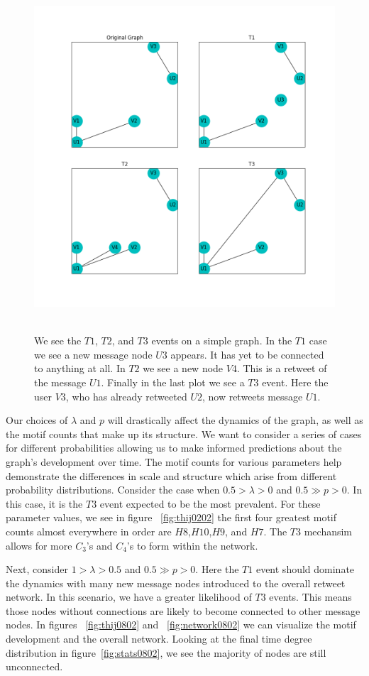 \begin{figure}
    \includegraphics[width=12cm]{Images/events.png}\
    \centering
    \caption{We see the $T1$, $T2$, and $T3$ events on a simple graph. In the $T1$ case 
    we see a new message node $U3$ appears. It has yet to be connected to anything at all. In $T2$
    we see a new node $V4$. This is a retweet of the message $U1$. Finally in the last plot we see
    a $T3$ event. Here the user $V3$, who has already retweeted $U2$, now retweets message $U1$.}
\end{figure}

Our choices of $\lambda$ and $p$ will drastically affect the dynamics of the graph, as well as the motif counts that make
up its structure. We want to consider a series of cases for different probabilities allowing us to make informed predictions about the graph's development over time.
The motif counts for various parameters help demonstrate the differences in scale 
and structure which arise from different probability distributions. Consider the case when $0.5 > \lambda > 0$ and $0.5 \gg p > 0$. In this case, it is the $T3$ event
expected to be the most prevalent. For these parameter values, we see in figure ~\ref{fig:thij0202} the first four greatest motif counts almost 
everywhere in order are $H8$,$H10$,$H9$, and $H7$. The $T3$ mechansim allows for more $C_3$'s and $C_4$'s to form within the network.


Next, consider $1>\lambda>0.5$ and $0.5 \gg p > 0$. Here the $T1$ event should dominate the dynamics
with many new message nodes introduced to the overall retweet network. In this scenario, we have
a greater likelihood of $T3$ events. This means those nodes without connections are likely to become connected to other message nodes. In figures
~\ref{fig:thij0802} and ~\ref{fig:network0802} we can visualize the motif development and the overall network. Looking at the final time degree
distribution in figure~\ref{fig:stats0802}, we see the majority of nodes are still unconnected.


